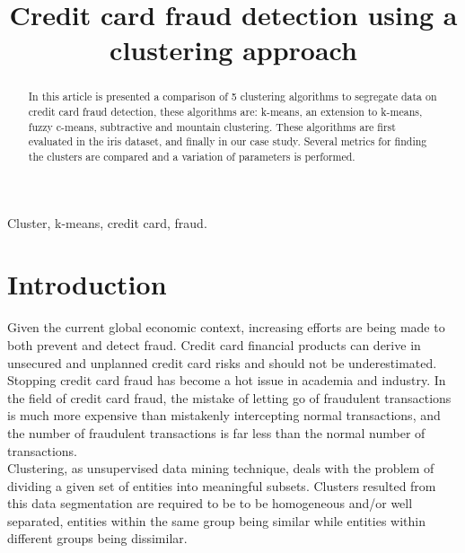 \documentclass[conference]{IEEEtran}
\begin{document}
\title{Credit card fraud detection using a clustering approach\\
}

\author{
}

\maketitle

\begin{abstract}
In this article is presented a comparison of 5 clustering algorithms to segregate data on credit card fraud detection, these algorithms are: k-means, an extension to k-means, fuzzy c-means, subtractive and mountain clustering. These algorithms are first evaluated in the iris dataset, and finally in our case study. Several metrics for finding the clusters are compared and a variation of parameters is performed.
\end{abstract}

\begin{IEEEkeywords}
Cluster, k-means, credit card, fraud.
\end{IEEEkeywords}

\section{Introduction}
Given the current global economic
context, increasing efforts are being made to both prevent and detect fraud. Credit card financial products can derive in unsecured and unplanned credit card risks and should not be underestimated. Stopping credit card fraud has become a hot issue in academia and industry. In the field of credit card fraud, the mistake of letting go of fraudulent transactions is much more expensive than mistakenly intercepting normal transactions, and the number of fraudulent transactions is far less than the normal number of transactions. \\
Clustering, as unsupervised data mining technique, deals with the problem of dividing a given set of entities into meaningful subsets. Clusters resulted from this data segmentation are required to be to be homogeneous and/or well separated, entities within the same group being similar while entities within different groups being dissimilar. 
\end{document}
